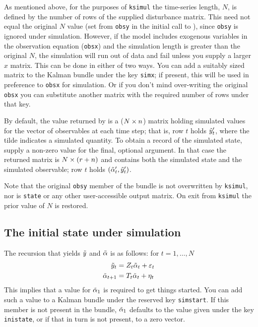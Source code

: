 As mentioned above, for the purposes of \texttt{ksimul} the
time-series length, $N$, is defined by the number of rows of the
supplied disturbance matrix. This need not equal the original $N$
value (set from \texttt{obsy} in the initial call to ),
since \texttt{obsy} is ignored under simulation. However, if the model
includes exogenous variables in the observation equation
(\texttt{obsx}) and the simulation length is greater than the original
$N$, the simulation will run out of data and fail unless you supply a
larger $x$ matrix.  This can be done in either of two ways. You can
add a suitably sized matrix to the Kalman bundle under the key
\texttt{simx}; if present, this will be used in preference to
\texttt{obsx} for simulation. Or if you don't mind over-writing the
original \texttt{obsx} you can substitute another matrix with the
required number of rows under that key.

By default, the value returned by  is a
($N \times n$) matrix holding simulated values for the vector of
observables at each time step; that is, row $t$ holds
$\tilde{y}_t'$, where the tilde indicates a simulated quantity.
To obtain a record of the simulated state, supply a non-zero value for
the final, optional argument. In that case the returned matrix is
$N \times (r + n)$ and contains both the simulated state
and the simulated observable; row $t$ holds
$(\tilde{\alpha}_t', \tilde{y}_t')$.

Note that the original \texttt{obsy} member of the bundle is not
overwritten by \texttt{ksimul}, nor is \texttt{state} or any other
user-accessible output matrix. On exit from \texttt{ksimul} the prior
value of $N$ is restored.

\subsection{The initial state under simulation}

The recursion that yields $\tilde{y}$ and $\tilde{\alpha}$
is as follows: for $t=1,\dots,N$
%
\begin{align*}
  \tilde{y}_t &= Z_t \tilde{\alpha}_t + \varepsilon_t  \\
  \tilde{\alpha}_{t+1} &= T_t \tilde{\alpha}_t + \eta_t
\end{align*}
%
This implies that a value for $\tilde{\alpha}_1$ is required to get
things started. You can add such a value to a Kalman bundle under the
reserved key \texttt{simstart}. If this member is not present in the
bundle, $\tilde{\alpha}_1$ defaults to the value given under the
key \texttt{inistate}, or if that in turn is not present, to a zero
vector.

